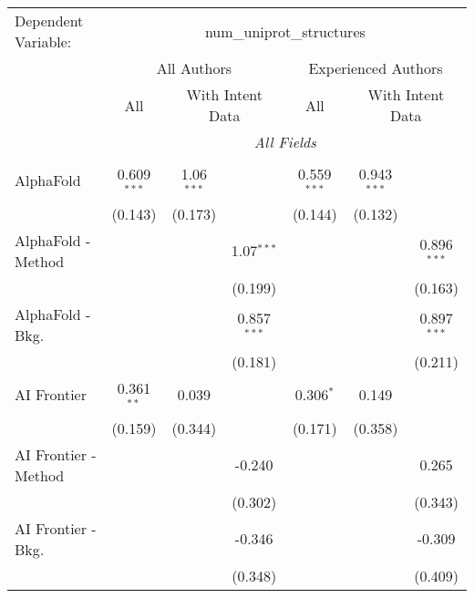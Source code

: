 \begingroup
\centering
\begin{tabular}{lcccccc}
   \tabularnewline \midrule \midrule
   Dependent Variable: & \multicolumn{6}{c}{num\_uniprot\_structures}\\
 & \multicolumn{3}{c}{All Authors} & \multicolumn{3}{c}{Experienced Authors} \\
\cmidrule(lr){2-4} \cmidrule(lr){5-7}
 & \multicolumn{1}{c}{All} & \multicolumn{2}{c}{With Intent Data} & \multicolumn{1}{c}{All} & \multicolumn{2}{c}{With Intent Data} \\
\cmidrule(lr){2-2} \cmidrule(lr){3-4} \cmidrule(lr){5-5} \cmidrule(lr){6-7}
 & \multicolumn{6}{c}{\textit{All Fields}} \\ \\
   AlphaFold            & 0.609$^{***}$ & 1.06$^{***}$ &               & 0.559$^{***}$ & 0.943$^{***}$ &   \\   
                        & (0.143)       & (0.173)      &               & (0.144)       & (0.132)       &   \\   
   AlphaFold - Method   &               &              & 1.07$^{***}$  &               &               & 0.896$^{***}$\\   
                        &               &              & (0.199)       &               &               & (0.163)\\   
   AlphaFold - Bkg.     &               &              & 0.857$^{***}$ &               &               & 0.897$^{***}$\\   
                        &               &              & (0.181)       &               &               & (0.211)\\   
   AI Frontier          & 0.361$^{**}$  & 0.039        &               & 0.306$^{*}$   & 0.149         &   \\   
                        & (0.159)       & (0.344)      &               & (0.171)       & (0.358)       &   \\   
   AI Frontier - Method &               &              & -0.240        &               &               & 0.265\\   
                        &               &              & (0.302)       &               &               & (0.343)\\   
   AI Frontier - Bkg.   &               &              & -0.346        &               &               & -0.309\\   
                        &               &              & (0.348)       &               &               & (0.409)\\   

\end{tabular}

